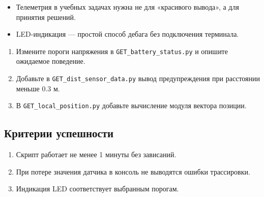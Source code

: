\begin{infobox}
\begin{itemize}
\item Телеметрия в учебных задачах нужна не для «красивого вывода», а для принятия решений.
\item LED-индикация — простой способ дебага без подключения терминала.
\end{itemize}
\end{infobox}

\begin{taskbox}
\begin{enumerate}
\item Измените пороги напряжения в \texttt{GET\_battery\_status.py} и опишите ожидаемое поведение.
\item Добавьте в \texttt{GET\_dist\_sensor\_data.py} вывод предупреждения при расстоянии меньше 0.3 м.
\item В \texttt{GET\_local\_position.py} добавьте вычисление модуля вектора позиции.
\end{enumerate}
\end{taskbox}

\subsection{Критерии успешности}
\begin{enumerate}
\item Скрипт работает не менее 1 минуты без зависаний.
\item При потере значения датчика в консоль не выводятся ошибки трассировки.
\item Индикация LED соответствует выбранным порогам.
\end{enumerate}
